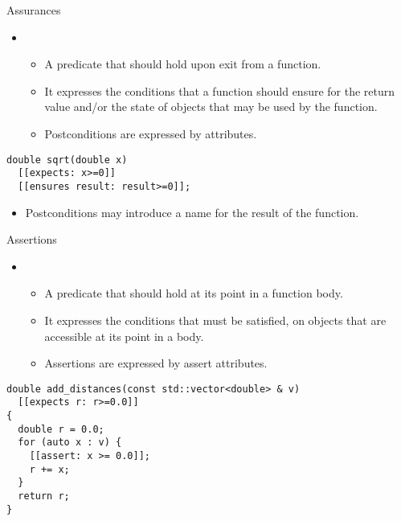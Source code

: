 \begin{frame}[t,fragile]{Assurances}
\begin{itemize}
  \item {}
    \begin{itemize}
      \item A predicate that should hold upon exit from a function.
      \item It expresses the conditions that a function should ensure for the 
            return value and/or the state of objects that may be used by the 
            function.
      \item Postconditions are expressed by  attributes.
    \end{itemize}
\end{itemize}

\vfill\pause
\begin{lstlisting}
double sqrt(double x)
  [[expects: x>=0]]
  [[ensures result: result>=0]];
\end{lstlisting}

\vfill\pause
\begin{itemize}
  \item Postconditions may introduce a name for the result of the function.
\end{itemize}
\end{frame}

\begin{frame}[t,fragile]{Assertions}
\begin{itemize}
  \item {}
    \begin{itemize}
      \item A predicate that should hold at its point in a function body.
      \item It expresses the conditions that must be satisfied, on objects that
are accessible at its point in a body.
      \item Assertions are expressed by assert attributes.
    \end{itemize}
\end{itemize}

\vfill\pause
\begin{lstlisting}
double add_distances(const std::vector<double> & v) 
  [[expects r: r>=0.0]]
{
  double r = 0.0;
  for (auto x : v) {
    [[assert: x >= 0.0]];
    r += x;
  }
  return r;
}
\end{lstlisting}
\end{frame}

